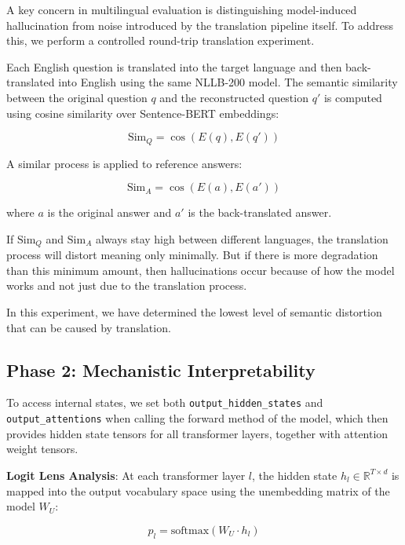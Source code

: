 \documentclass[conference]{IEEEtran}
\begin{document}
A key concern in multilingual evaluation is distinguishing model-induced hallucination from noise introduced by the translation pipeline itself. To address this, we perform a controlled round-trip translation experiment.

Each English question is translated into the target language and then back-translated into English using the same NLLB-200 model. The semantic similarity between the original question $q$ and the reconstructed question $q'$ is computed using cosine similarity over Sentence-BERT embeddings:

\begin{equation}
\text{Sim}_{Q} = \cos(E(q), E(q'))
\end{equation}

A similar process is applied to reference answers:

\begin{equation}
\text{Sim}_{A} = \cos(E(a), E(a'))
\end{equation}

where $a$ is the original answer and $a'$ is the back-translated answer.

If $\text{Sim}_{Q}$ and $\text{Sim}_{A}$ always stay high between different languages, the translation process will distort meaning only minimally. But if there is more degradation than this minimum amount, then hallucinations occur because of how the model works and not just due to the translation process.

In this experiment, we have determined the lowest level of semantic distortion that can be caused by translation.

\subsection{Phase 2: Mechanistic Interpretability}

To access internal states, we set both  \texttt{output\_hidden\_states} and \texttt{output\_attentions} when calling the forward method of the model,
which then provides hidden state tensors for all transformer layers, together with attention weight tensors.

\textbf{Logit Lens Analysis}: At each transformer layer $l$, the hidden state $h_l \in \mathbb{R}^{T \times d}$ is mapped into the output vocabulary space using the
unembedding matrix of the model $W_U$:

\begin{equation}
p_l = \text{softmax}(W_U \cdot h_l)
\end{equation}
\end{document}
